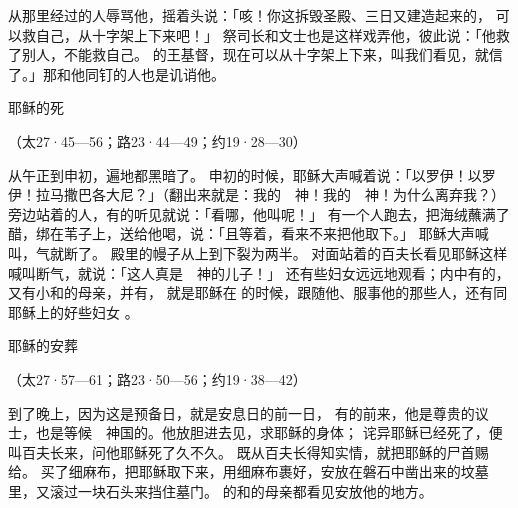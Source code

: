 {从那里经过的人辱骂他，摇着头说：「咳！你这拆毁圣殿、三日又建造起来的，
可以救自己，从十字架上下来吧！」
祭司长和文士也是这样戏弄他，彼此说：「他救了别人，不能救自己。
的王基督，现在可以从十字架上下来，叫我们看见，就信了。」那和他同钉的人也是讥诮他。
\par }{\SH 耶稣的死
\par }{\R （太27·45—56；路23·44—49；约19·28—30）
\par }{\PP {}从午正到申初，遍地都黑暗了。
申初的时候，耶稣大声喊着说：「以罗伊！以罗伊！拉马撒巴各大尼？」（翻出来就是：我的　神！我的　神！为什么离弃我？）
旁边站着的人，有的听见就说：「看哪，他叫{}呢！」
有一个人跑去，把海绒蘸满了醋，绑在苇子上，送给他喝，说：「且等着，看{}来不来把他取下。」
耶稣大声喊叫，气就断了。
殿里的幔子从上到下裂为两半。
对面站着的百夫长看见耶稣这样喊叫断气，就说：「这人真是　神的儿子！」
还有些妇女远远地观看；内中有{}的{}，又有小{}和{}的母亲{}，并有{}，
就是耶稣在
{}的时候，跟随他、服事他的那些人，还有同耶稣上{}的好些妇女
{}。
\par }{\SH 耶稣的安葬
\par }{\R （太27·57—61；路23·50—56；约19·38—42）
\par }{\PP {}到了晚上，因为这是预备日，就是安息日的前一日，
有{}的{}前来，他是尊贵的议士，也是等候　神国的。他放胆进去见{}，求耶稣的身体；
诧异耶稣已经死了，便叫百夫长来，问他耶稣死了久不久。
既从百夫长得知实情，就把耶稣的尸首赐给{}。
买了细麻布，把耶稣取下来，用细麻布裹好，安放在磐石中凿出来的坟墓里，又滚过一块石头来挡住墓门。
的{}和{}的母亲{}都看见安放他的地方。

}

